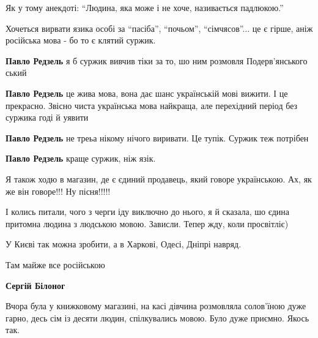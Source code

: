  
 
 
 
 
\zzSecCmt

\begin{itemize} %
Як у тому анекдоті: \enquote{Людина, яка може і не хоче, називається падлюкою.}

Хочеться вирвати язика особі за \enquote{пасіба}, \enquote{почьом},
\enquote{сімчясов}... це є гірше, аніж російська мова - бо то є клятий суржик.

\begin{itemize} %
\textbf{Павло Редзель} я б суржик вивчив тіки за то, шо ним розмовля Подерв'янського ський

\textbf{Павло Редзель} це жива мова, вона дає шанс українській мові вижити. І це прекрасно. Звісно чиста українська мова найкраща, але перехідний період без суржика годі й уявити

\textbf{Павло Редзель} не треьа нікому нічого виривати. Це тупік. Суржик теж потрібен

\textbf{Павло Редзель} краще суржик, ніж язік.
\end{itemize} %


Я також ходю в магазин, де є єдиний продавець, який говоре українською. Ах, як
же він говоре!!! Ну пісня!!!!!

І колись питали, чого з черги іду виключно до нього, я й сказала, шо єдина
притомна людина з людською мовою. Зависли. Тепер жду, коли просвітліє)



У Києві так можна зробити, а в Харкові, Одесі, Дніпрі навряд.

Там майже все російською

\begin{itemize} %
\textbf{Сергій Білоног} 

Вчора була у книжковому магазині, на касі дівчина розмовляла солов'їною дуже
гарно, десь сім із десяти людин, спілкувались мовою. Було дуже приємно. Якось
так.



\end{itemize}
\end{itemize}
